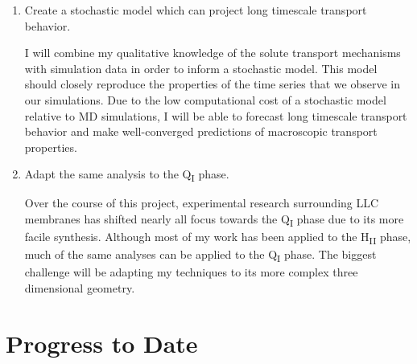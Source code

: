 \documentclass{article}
\begin{document}
\begin{enumerate}
    \item Create a stochastic model which can project long timescale 
    transport behavior.
    
    I will combine my qualitative knowledge of the solute transport mechanisms
    with simulation data in order to inform a stochastic model. This model
    should closely reproduce the properties of the time series that we observe 
    in our simulations. Due to the low computational cost of a stochastic model
    relative to MD simulations, I will be able to forecast long timescale transport
    behavior and make well-converged predictions of macroscopic transport properties.
           
    \item Adapt the same analysis to the Q\textsubscript{I} phase.
    
    Over the course of this project, experimental research surrounding
    LLC membranes has shifted nearly all focus towards the Q\textsubscript{I}
    phase due to its more facile synthesis.	Although most of my work has 
    been applied to the H\textsubscript{II} phase, much of the same analyses
    can be applied to the Q\textsubscript{I} phase. The biggest challenge will
    be adapting my techniques to its more complex three dimensional geometry.
    
%    
    
  \end{enumerate}

  \section{Progress to Date}\label{section:progress}
  
\end{document}
